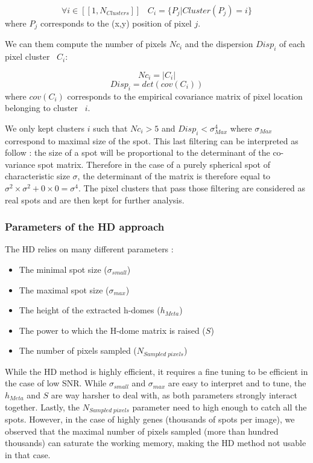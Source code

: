 \documentclass[12pt]{article}
\begin{document}
\begin{equation}
\forall i \in [[1,N_{Clusters}]] \;  \;   \; C_{i} = \{P_{j} | Cluster(P_{j})=i \}
\end{equation}
where $P_{j}$ corresponds to the (x,y) position of pixel $j$.

We can them compute the number of pixels $Nc_{i}$  and the dispersion $Disp_{i}$ of  each pixel cluster~ $C_{i}$:

\begin{equation}
 Nc_{i} = |C_{i}|
\end{equation}
\begin{equation}
Disp_{i} = det(cov(C_{i}))
\end{equation}
where $cov(C_{i})$ corresponds to the empirical covariance matrix of pixel location belonging to cluster~ $i$.

We only kept clusters $i$ such that $Nc_{i} >5$ and $Disp_{i} < \sigma_{Max}^4$ where $\sigma_{Max}$ correspond to maximal size of the spot. This last filtering can be interpreted as follow : the size of a spot will be proportional to the determinant of the co-variance spot matrix. Therefore in the case of a purely spherical spot of characteristic size $\sigma$, the determinant of the matrix is therefore equal to $\sigma^2 \times \sigma^2 + 0 \times 0 = \sigma^4$.
The pixel clusters that pass those filtering are  considered as real spots and are then kept for further analysis.

\subsubsection{Parameters of the HD approach}

The HD relies on many different parameters  :
\begin{itemize}
\item The minimal spot size ($\sigma_{small}$)
\item The maximal spot size ($\sigma_{max}$)
\item The height of the extracted h-domes  ($h_{Meta}$)
\item The power to which the H-dome matrix is raised ($S$)
\item The number of pixels sampled ($N_{Sampled \; pixels}$)
\end{itemize}

While the HD method is highly efficient, it requires a fine tuning to be efficient in the case of low SNR. While $\sigma_{small}$ and $\sigma_{max}$ are easy to interpret and to tune, the $h_{Meta}$ and $S$ are way harsher to deal with, as both parameters strongly interact together. Lastly, the  $N_{Sampled \; pixels}$ parameter need to high enough to catch all the spots. However, in the case of highly genes (thousands of spots per image), we observed that the maximal number of pixels sampled (more than hundred thousands) can saturate the working memory, making the HD method not usable in that case.
\end{document}

